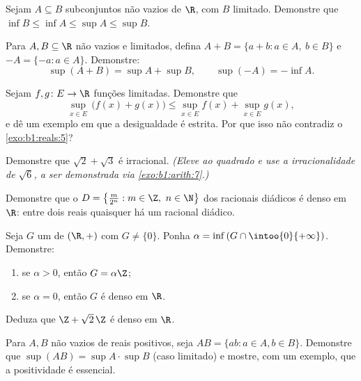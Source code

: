 \begin{exercise}[$\star$]\label{exo:b1:reals:4}
Sejam $A \subseteq B$ subconjuntos não vazios de $\R$, com $B$ limitado.
Demonstre que $\inf B \leq \inf A \leq \sup A \leq \sup B$.
\end{exercise}

\begin{exercise}[$\star\star$]\label{exo:b1:reals:5}
Para $A, B \subseteq \R$ não vazios e limitados, defina $A + B = \{a + b : a
\in A,\ b \in B\}$ e $-A = \{-a : a \in A\}$. Demonstre:
\[
\sup(A + B) = \sup A + \sup B,
\qquad
\sup(-A) = -\inf A .
\]
\end{exercise}

\begin{exercise}[$\star\star$]\label{exo:b1:reals:6}
Sejam $f, g \colon E \to \R$ funções limitadas. Demonstre que
\[
\sup_{x \in E}\, \bigl(f(x) + g(x)\bigr) \leq \sup_{x \in E} f(x) +
\sup_{x \in E} g(x),
\]
e dê um exemplo em que a desigualdade é estrita. Por que isso não
contradiz o \cref{exo:b1:reals:5}?
\end{exercise}

\begin{exercise}[$\star\star$]\label{exo:b1:reals:7}
Demonstre que $\sqrt 2 + \sqrt 3$ é irracional. \emph{(Eleve ao quadrado e
use a irracionalidade de $\sqrt 6$, a ser demonstrada via
\cref{exo:b1:arith:7}.)}
\end{exercise}

\begin{exercise}[$\star\star$]\label{exo:b1:reals:8}
Demonstre que o  $D = \bigl\{\frac{m}{2^n} : m \in \Z,\ n \in
\N\bigr\}$ dos racionais diádicos é denso em $\R$: entre dois reais
quaisquer há um racional diádico.
\end{exercise}

\begin{exercise}[$\star\star\star$]\label{exo:b1:reals:9}
Seja $G$ um  de $(\R, +)$ com $G \neq \{0\}$. Ponha $\alpha =
\inf\,(G \cap \intoo{0}{+\infty})$. Demonstre:
\begin{enumerate}
  \item se $\alpha > 0$, então $G = \alpha\Z$;
  \item se $\alpha = 0$, então $G$ é denso em $\R$.
\end{enumerate}
Deduza que $\Z + \sqrt 2\,\Z$ é denso em $\R$.
\end{exercise}

\begin{exercise}[$\star\star\star$]\label{exo:b1:reals:10}
Para $A, B$  não vazios de reais positivos, seja $AB = \{ab : a \in
A, b \in B\}$. Demonstre que $\sup(AB) = \sup A \cdot \sup B$ (caso limitado)
e mostre, com um exemplo, que a positividade é essencial.
\end{exercise}

